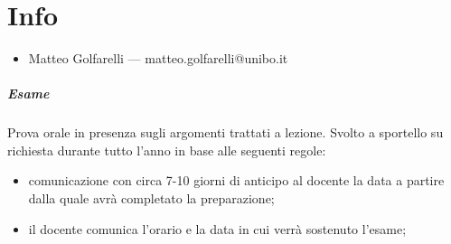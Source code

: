 \documentclass[12pt, a4paper]{scrreprt}
\begin{document}
\makefront{}

\begingroup
    \hypersetup{linkbordercolor=white, linkcolor=black} 
    \tableofcontents

    \newpage
\endgroup

\chapter{Info}\label{chap:info} %
\begin{itemize}
    \item Matteo Golfarelli --- matteo.golfarelli@unibo.it
\end{itemize}
\paragraph{Esame}\label{par:esame} %
Prova orale in presenza sugli argomenti trattati a lezione.
Svolto a sportello su richiesta durante tutto l'anno in base alle seguenti regole:
\begin{itemize}
    \item comunicazione con circa 7-10 giorni di anticipo al docente la data a partire dalla quale avrà completato la preparazione;
    \item il docente comunica l'orario e la data in cui verrà sostenuto l'esame;
\end{itemize}
\end{document}
